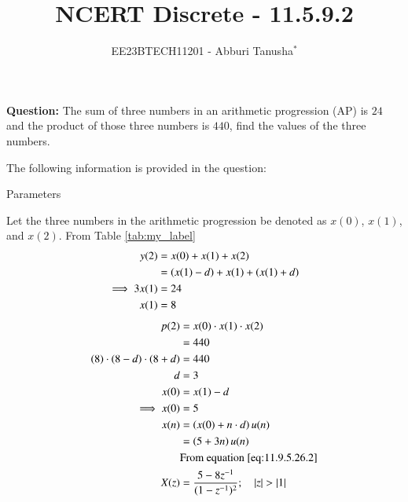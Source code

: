 \documentclass[journal,12pt,twocolumn]{IEEEtran}
\theoremstyle{remark}
\begin{document}

\vspace{3cm}

\title{NCERT Discrete - 11.5.9.2}
\author{EE23BTECH11201 - Abburi Tanusha$^{*}$%
}
\maketitle
\newpage
\bigskip

\renewcommand{\thefigure}{\theenumi}
\renewcommand{\thetable}{\theenumi}

\vspace{3cm}

\maketitle
\textbf{Question:} 
The sum of three numbers in an arithmetic progression (AP) is $24$ and the product of those three numbers is $440$, find the values of the three numbers.

\solution
The following information is provided in the question:
\begin{table}[h]
 	\centering
 	\resizebox{6 cm}{!}{
 		
 	}
 	\vspace{6 pt}
 	\caption{Parameters}
 	\label{tab:my_label} 
 \end{table}
\newline
Let the three numbers in the arithmetic progression be denoted as $x(0)$, $x(1)$, and $x(2)$.
\newline
From Table \ref{tab:my_label}
\begin{align}
  y(2) &= x(0) + x(1) + x(2) \\ 
    &= \left(x(1) - d \right) + x(1) + \left(x(1) + d\right) \\
    \implies 3x(1) &= 24 \\ 
    x(1) &= 8 \\
    \end{align}
    \begin{align}
   p(2) &= x(0) \cdot x(1) \cdot x(2)   \\
   &= 440  \\
    \left(8\right) \cdot \left(8-d\right) \cdot \left(8+d\right) &= 440  \\
   d &= 3  \\
     x(0) &= x(1) - d \\
     \implies x(0) &= 5  \\
    x(n) &= \left(x(0) + n \cdot d\right) u(n)  \\
         &= \left(5 + 3n\right)u(n)  \\
         &\text{From equation \eqref{eq:11.9.5.26.2}}  \\
    X(z) &= \frac{5 - 8z^{-1}}{(1-z^{-1})^2} ; \quad \left\vert z\right\vert>\left\vert1\right\vert 
\end{align}
\end{document}
